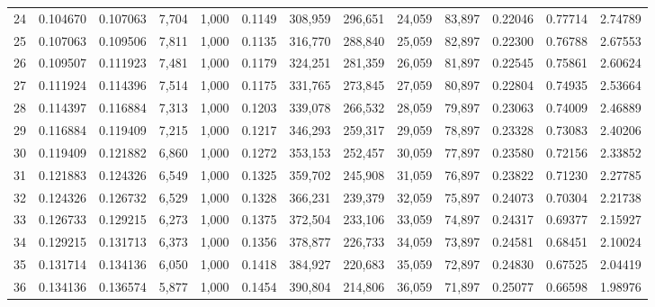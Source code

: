 \begin{tabular}{rrrrrrrrrrrrr}
24  &  0.104670 &  0.107063 &   7,704 &  1,000 &                                     0.1149 &  308,959 &  296,651 &   24,059 &   83,897 &  0.22046 &  0.77714 &  2.74789 \\
25  &  0.107063 &  0.109506 &   7,811 &  1,000 &                                     0.1135 &  316,770 &  288,840 &   25,059 &   82,897 &  0.22300 &  0.76788 &  2.67553 \\
26  &  0.109507 &  0.111923 &   7,481 &  1,000 &                                     0.1179 &  324,251 &  281,359 &   26,059 &   81,897 &  0.22545 &  0.75861 &  2.60624 \\
27  &  0.111924 &  0.114396 &   7,514 &  1,000 &                                     0.1175 &  331,765 &  273,845 &   27,059 &   80,897 &  0.22804 &  0.74935 &  2.53664 \\
28  &  0.114397 &  0.116884 &   7,313 &  1,000 &                                     0.1203 &  339,078 &  266,532 &   28,059 &   79,897 &  0.23063 &  0.74009 &  2.46889 \\
29  &  0.116884 &  0.119409 &   7,215 &  1,000 &                                     0.1217 &  346,293 &  259,317 &   29,059 &   78,897 &  0.23328 &  0.73083 &  2.40206 \\
30  &  0.119409 &  0.121882 &   6,860 &  1,000 &                                     0.1272 &  353,153 &  252,457 &   30,059 &   77,897 &  0.23580 &  0.72156 &  2.33852 \\
31  &  0.121883 &  0.124326 &   6,549 &  1,000 &                                     0.1325 &  359,702 &  245,908 &   31,059 &   76,897 &  0.23822 &  0.71230 &  2.27785 \\
32  &  0.124326 &  0.126732 &   6,529 &  1,000 &                                     0.1328 &  366,231 &  239,379 &   32,059 &   75,897 &  0.24073 &  0.70304 &  2.21738 \\
33  &  0.126733 &  0.129215 &   6,273 &  1,000 &                                     0.1375 &  372,504 &  233,106 &   33,059 &   74,897 &  0.24317 &  0.69377 &  2.15927 \\
34  &  0.129215 &  0.131713 &   6,373 &  1,000 &                                     0.1356 &  378,877 &  226,733 &   34,059 &   73,897 &  0.24581 &  0.68451 &  2.10024 \\
35  &  0.131714 &  0.134136 &   6,050 &  1,000 &                                     0.1418 &  384,927 &  220,683 &   35,059 &   72,897 &  0.24830 &  0.67525 &  2.04419 \\
36  &  0.134136 &  0.136574 &   5,877 &  1,000 &                                     0.1454 &  390,804 &  214,806 &   36,059 &   71,897 &  0.25077 &  0.66598 &  1.98976 \\

\end{tabular}
